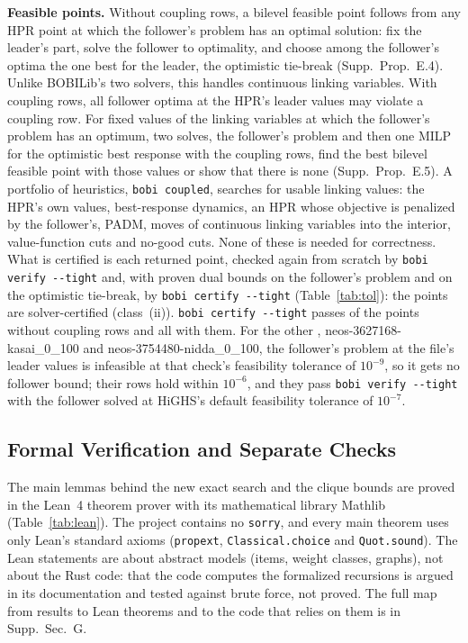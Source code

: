 \documentclass[]{spie}  %
\theoremstyle{plain}
\newcommand{\supp}[1]{Supp.\ Sec.~#1}
\newcommand{\code}[1]{\texttt{#1}}
\newcommand{\inst}[1]{\mbox{#1}}             %
\newcommand{\cls}[1]{class~(#1)}             %
\begin{document}
\textbf{Feasible points.} Without coupling rows, a bilevel feasible point follows from any HPR
point at which the follower's problem has an optimal solution: fix the leader's part, solve the
follower to optimality, and choose among the follower's optima the one best for the leader, the
optimistic tie-break (Supp.\ Prop.~E.4). Unlike BOBILib's two solvers, this handles continuous
linking variables. With coupling rows, all follower optima at the HPR's leader values may violate
a coupling row. For fixed values of the linking variables at which the follower's problem has an
optimum, two solves, the follower's problem and then one MILP for the optimistic best response
with the coupling rows, find the best bilevel feasible point with those values or show that there
is none (Supp.\ Prop.~E.5). A portfolio of heuristics, \code{bobi coupled}, searches for usable
linking values: the HPR's own values, best-response dynamics, an HPR whose objective is penalized
by the follower's, PADM,\cite{kleinert2021computing} moves of continuous linking variables into
the interior, value-function cuts\cite{mitsos2010global,lozano2017value} and no-good cuts. None
of these is needed for correctness. What is certified is each returned point, checked again from
scratch by \code{bobi verify -{}-tight} and, with proven dual bounds on the follower's problem and
on the optimistic tie-break, by \code{bobi certify -{}-tight} (Table~\ref{tab:tol}): the points are
solver-certified (\cls{ii}). \code{bobi certify -{}-tight} passes \NumGeneralTightCertified{} of the
\NumGeneralFiles{} points without coupling rows and all \NumCoupledTightCertified{} with them. For
the other \NumGeneralTightNoBound{}, \inst{neos-3627168-kasai\_0\_100} and
\inst{neos-3754480-nidda\_0\_100}, the follower's problem at the file's leader values is infeasible
at that check's feasibility tolerance of $10^{-9}$, so it gets no follower bound; their rows hold
within $10^{-6}$, and they pass \code{bobi verify -{}-tight} with the follower solved at HiGHS's
default feasibility tolerance of $10^{-7}$.

\subsection{Formal Verification and Separate Checks}\label{sec:lean}

The main lemmas behind the new exact search and the clique bounds are proved in the Lean~4
theorem prover\cite{moura2021lean} with its mathematical library Mathlib\cite{mathlib2020}
(Table~\ref{tab:lean}). The project contains no \code{sorry}, and every main theorem uses only
Lean's standard axioms (\code{propext}, \code{Classical.choice} and \code{Quot.sound}). The Lean
statements are about abstract models (items, weight classes, graphs), not about the Rust code:
that the code computes the formalized recursions is argued in its documentation and tested
against brute force, not proved. The full map from results to Lean theorems and to the code that
relies on them is in \supp{G}.
\end{document}
